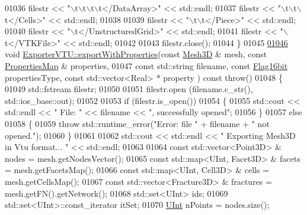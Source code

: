 \begin{DoxyCode}
01036     filestr << \textcolor{stringliteral}{"\(\backslash\)t\(\backslash\)t\(\backslash\)t\(\backslash\)t</DataArray>"} << std::endl;
01037     filestr << \textcolor{stringliteral}{"\(\backslash\)t\(\backslash\)t\(\backslash\)t</Cells>"} << std::endl;
01038 
01039     filestr << \textcolor{stringliteral}{"\(\backslash\)t\(\backslash\)t</Piece>"} << std::endl;
01040     filestr << \textcolor{stringliteral}{"\(\backslash\)t</UnstructuredGrid>"} << std::endl;
01041     filestr << \textcolor{stringliteral}{"\(\backslash\)t</VTKFile>"} << std::endl;
01042 
01043     filestr.close();
01044 \}
01045 
\hypertarget{ExportVTU_8cpp_source.tex_l01046}{}\hyperlink{classFVCode3D_1_1ExporterVTU_a12240c4de9e7b3a5bf8f513c873c4547}{01046} \textcolor{keywordtype}{void} \hyperlink{classFVCode3D_1_1ExporterVTU_a12240c4de9e7b3a5bf8f513c873c4547}{ExporterVTU::exportWithProperties}(\textcolor{keyword}{const} 
      \hyperlink{classFVCode3D_1_1Mesh3D}{Mesh3D} & mesh, \textcolor{keyword}{const} \hyperlink{classFVCode3D_1_1PropertiesMap}{PropertiesMap} & properties,
01047     \textcolor{keyword}{const} std::string filename, \textcolor{keyword}{const} \hyperlink{namespaceFVCode3D_a17a9cb86e2e25bbfbfcb645a2eec1d64}{Flag16bit} propertiesType, \textcolor{keyword}{const} std::vector<Real> * property
      ) \textcolor{keyword}{const} \textcolor{keywordflow}{throw}()
01048 \{
01049     std::fstream filestr;
01050 
01051     filestr.open (filename.c\_str(), std::ios\_base::out);
01052 
01053     \textcolor{keywordflow}{if} (filestr.is\_open())
01054     \{
01055         std::cout << std::endl << \textcolor{stringliteral}{" File: "} << filename << \textcolor{stringliteral}{", successfully opened"};
01056     \}
01057     \textcolor{keywordflow}{else}
01058     \{
01059         \textcolor{keywordflow}{throw} std::runtime\_error(\textcolor{stringliteral}{"Error: file "} + filename + \textcolor{stringliteral}{" not opened."});
01060     \}
01061 
01062     std::cout << std::endl << \textcolor{stringliteral}{" Exporting Mesh3D in Vtu format... "} << std::endl;
01063 
01064     \textcolor{keyword}{const} std::vector<Point3D> & nodes = mesh.getNodesVector();
01065     \textcolor{keyword}{const} std::map<UInt, Facet3D> & facets = mesh.getFacetsMap();
01066     \textcolor{keyword}{const} std::map<UInt, Cell3D> & cells = mesh.getCellsMap();
01067     \textcolor{keyword}{const} std::vector<Fracture3D> & fractures = mesh.getFN().getNetwork();
01068     std::set<UInt> ids;
01069     std::set<UInt>::const\_iterator itSet;
01070     \hyperlink{namespaceFVCode3D_a4bf7e328c75d0fd504050d040ebe9eda}{UInt} nPoints = nodes.size();

\end{DoxyCode}
